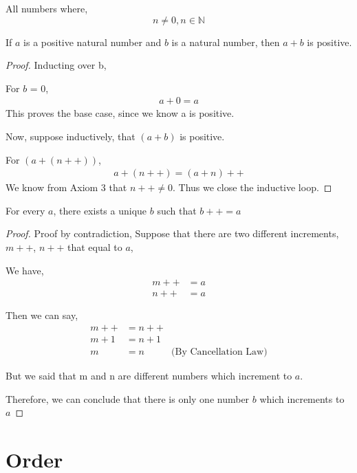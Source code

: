 \documentclass[11pt]{report}
\begin{document}
\begin{definition}
	All numbers where,
	\[
		n \neq 0, n \in \mathbb{N}
	\]
\end{definition}
\begin{prop}
	If $a$ is a positive natural number and $b$ is a natural number, then $a+b$ is positive.
\end{prop}
\begin{proof}
	Inducting over b,

	For $b$ = 0,
	\begin{align*}
		a+0 = a
	\end{align*}
	This proves the base case, since we know a is positive.

	Now, suppose inductively, that $(a+b)$ is positive.

	For $(a+(n++))$,
	\begin{align*}
		a+(n++) = (a+n)++
	\end{align*}
	We know from Axiom 3 that $n++ \neq 0$. Thus we close the inductive loop.
\end{proof}
\begin{lemma}
	For every $a$, there exists a unique $b$ such that $b++ = a$
\end{lemma}
\begin{proof}
	Proof by contradiction,
	Suppose that there are two different increments, $m++$, $n++$ that equal to $a$,

	We have,
	\begin{align*}
		m++ & = a \\
		n++ & = a
	\end{align*}

	Then we can say,
	\begin{align*}
		m++   & = n++ &                              \\
		m + 1 & = n+1 &                              \\
		m     & = n   & \text{(By Cancellation Law)}
	\end{align*}

	But we said that m and n are different numbers which increment to $a$.

	Therefore, we can conclude that there is only one number $b$ which increments to $a$
\end{proof}
\section{Order}
\end{document}
